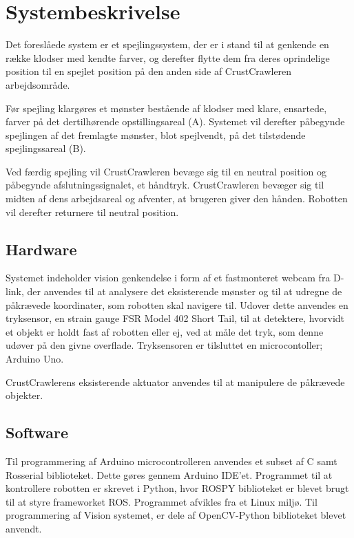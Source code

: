 \chapter{Systembeskrivelse}\label{chap:Systembeskrivelse}
Det foreslåede system er et spejlingssystem, der er i stand til at genkende en række klodser med kendte farver, og derefter flytte dem fra deres oprindelige position til en spejlet position på den anden side af CrustCrawleren arbejdsområde. 

Før spejling klargøres et mønster bestående af klodser med klare, ensartede, farver på det dertilhørende opstillingsareal (A).
Systemet vil derefter påbegynde spejlingen af det fremlagte mønster, blot spejlvendt, på det tilstødende spejlingssareal (B).

Ved færdig spejling vil CrustCrawleren bevæge sig til en neutral position og påbegynde afslutningssignalet, et håndtryk.
CrustCrawleren bevæger sig til midten af dens arbejdsareal og afventer, at brugeren giver den hånden.
Robotten vil derefter returnere til neutral position.
\newpage

\section{Hardware}\label{sec:Hardware}
Systemet indeholder vision genkendelse i form af et fastmonteret webcam fra D-link, der anvendes til at analysere det eksisterende mønster og til at udregne de påkrævede koordinater, som robotten skal navigere til. 
Udover dette anvendes en tryksensor, en strain gauge FSR\textsuperscript{\textregistered} Model 402 Short Tail, til at detektere, hvorvidt et objekt er holdt fast af robotten eller ej, ved at måle det tryk, som denne udøver på den givne overflade.
Tryksensoren er tilsluttet en microcontoller; Arduino Uno.

CrustCrawlerens eksisterende aktuator anvendes til at manipulere de påkrævede objekter.

\section{Software}\label{sec:Software}
Til programmering af Arduino microcontrolleren anvendes et subset af C samt Rosserial biblioteket.
Dette gøres gennem Arduino IDE'et.
Programmet til at kontrollere robotten er skrevet i Python, hvor ROSPY biblioteket er blevet brugt til at styre frameworket ROS.
Programmet afvikles fra et Linux miljø.
Til programmering af Vision systemet, er dele af OpenCV-Python biblioteket blevet anvendt. 